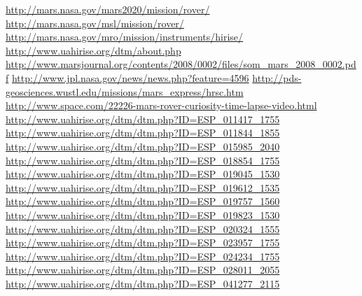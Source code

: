 \documentclass[12pt]{article}
\begin{document}
\begin{thebibliography}{30}
  \url{http://mars.nasa.gov/mars2020/mission/rover/}
  \url{http://mars.nasa.gov/msl/mission/rover/}
  \url{http://mars.nasa.gov/mro/mission/instruments/hirise/}
  \url{http://www.uahirise.org/dtm/about.php}
  \url{http://www.marsjournal.org/contents/2008/0002/files/som_mars_2008_0002.pdf}
  \url{http://www.jpl.nasa.gov/news/news.php?feature=4596}
  \url{http://pds-geosciences.wustl.edu/missions/mars_express/hrsc.htm}
  \url{http://www.space.com/22226-mars-rover-curiosity-time-lapse-video.html}
  \url{http://www.uahirise.org/dtm/dtm.php?ID=ESP_011417_1755}
  \url{http://www.uahirise.org/dtm/dtm.php?ID=ESP_011844_1855}
  \url{http://www.uahirise.org/dtm/dtm.php?ID=ESP_015985_2040}
  \url{http://www.uahirise.org/dtm/dtm.php?ID=ESP_018854_1755}
  \url{http://www.uahirise.org/dtm/dtm.php?ID=ESP_019045_1530}
  \url{http://www.uahirise.org/dtm/dtm.php?ID=ESP_019612_1535}
  \url{http://www.uahirise.org/dtm/dtm.php?ID=ESP_019757_1560}
  \url{http://www.uahirise.org/dtm/dtm.php?ID=ESP_019823_1530}
  \url{http://www.uahirise.org/dtm/dtm.php?ID=ESP_020324_1555}
  \url{http://www.uahirise.org/dtm/dtm.php?ID=ESP_023957_1755}
  \url{http://www.uahirise.org/dtm/dtm.php?ID=ESP_024234_1755}
  \url{http://www.uahirise.org/dtm/dtm.php?ID=ESP_028011_2055}
  \url{http://www.uahirise.org/dtm/dtm.php?ID=ESP_041277_2115}
\end{thebibliography}
\end{document}
